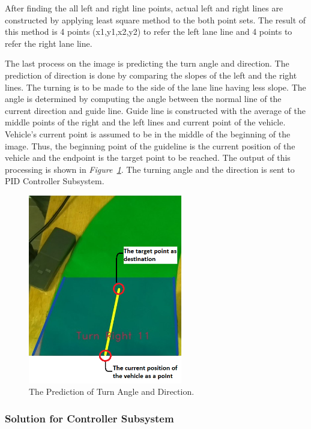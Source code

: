 \documentclass[a4paper,12pt]{article}
\begin{document}
After finding the all left and right line points, actual left and right lines are constructed by applying least square method to the both point sets. The result of this method is 4 points (x1,y1,x2,y2) to refer the left lane line and 4 points to refer the right lane line.

The last process on the image is predicting the turn angle and direction. The prediction of direction is done by comparing the slopes of the left and the right lines. The turning is to be made to the side of the lane line having less slope. The angle is determined by computing the angle between the normal line of the current direction and guide line. Guide line is constructed with the average of the middle points of the right and the left lines and current point of the vehicle. Vehicle's current point is assumed to be in the middle of the beginning of the image. Thus, the beginning point of the guideline is the current position of the vehicle and the endpoint is the target point to be reached. The output of this processing is shown in \textit{Figure~\ref{fig:turn-prediction-explained}}. The turning angle and the direction is sent to PID Controller Subsystem.

\begin{figure}[H]
	\center
	\setlength{\unitlength}{\textwidth} 
	\includegraphics[width=0.6\textwidth]{images/turn-prediction-explained}
	\caption{\label{fig:turn-prediction-explained}The Prediction of Turn Angle and Direction.}
\end{figure}	

		\subsubsection{Solution for Controller Subsystem}
			
\end{document}
